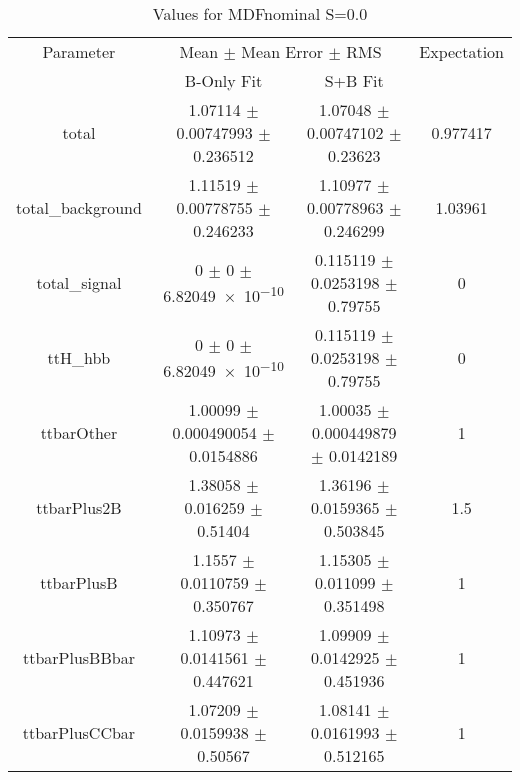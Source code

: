 \begin{table}
\centering
\caption{Values for MDFnominal S=0.0}
\begin{tabular}{cccc}
\toprule
Parameter & \multicolumn{2}{c}{Mean $\pm$ Mean Error $\pm$ RMS} & Expectation\\
 & B-Only Fit & S+B Fit & \\
\midrule
total & \num{1.07114} $\pm$ \num{0.00747993} $\pm$ \num{0.236512} & \num{1.07048} $\pm$ \num{0.00747102} $\pm$ \num{0.23623} & \num{0.977417}\\
total\_background & \num{1.11519} $\pm$ \num{0.00778755} $\pm$ \num{0.246233} & \num{1.10977} $\pm$ \num{0.00778963} $\pm$ \num{0.246299} & \num{1.03961}\\
total\_signal & \num{0} $\pm$ \num{0} $\pm$ \num{6.82049e-10} & \num{0.115119} $\pm$ \num{0.0253198} $\pm$ \num{0.79755} & \num{0}\\
ttH\_hbb & \num{0} $\pm$ \num{0} $\pm$ \num{6.82049e-10} & \num{0.115119} $\pm$ \num{0.0253198} $\pm$ \num{0.79755} & \num{0}\\
ttbarOther & \num{1.00099} $\pm$ \num{0.000490054} $\pm$ \num{0.0154886} & \num{1.00035} $\pm$ \num{0.000449879} $\pm$ \num{0.0142189} & \num{1}\\
ttbarPlus2B & \num{1.38058} $\pm$ \num{0.016259} $\pm$ \num{0.51404} & \num{1.36196} $\pm$ \num{0.0159365} $\pm$ \num{0.503845} & \num{1.5}\\
ttbarPlusB & \num{1.1557} $\pm$ \num{0.0110759} $\pm$ \num{0.350767} & \num{1.15305} $\pm$ \num{0.011099} $\pm$ \num{0.351498} & \num{1}\\
ttbarPlusBBbar & \num{1.10973} $\pm$ \num{0.0141561} $\pm$ \num{0.447621} & \num{1.09909} $\pm$ \num{0.0142925} $\pm$ \num{0.451936} & \num{1}\\
ttbarPlusCCbar & \num{1.07209} $\pm$ \num{0.0159938} $\pm$ \num{0.50567} & \num{1.08141} $\pm$ \num{0.0161993} $\pm$ \num{0.512165} & \num{1}\\
\bottomrule
\end{tabular}
\end{table}